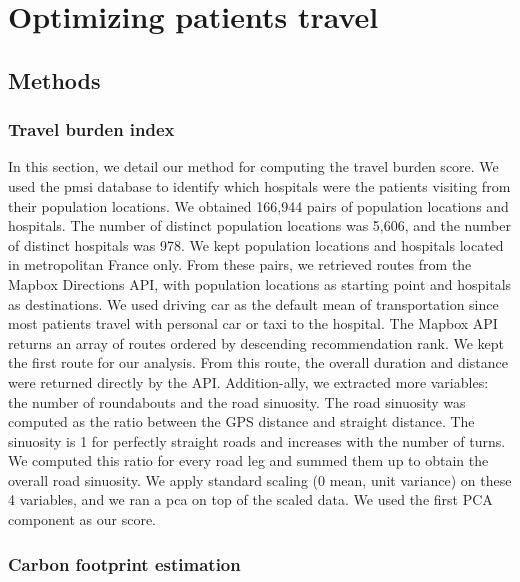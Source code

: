 \chapter{Optimizing patients travel}

\section{Methods}

\subsection{Travel burden index}

In this section, we detail our method for computing the travel burden score. We
used the \ac{pmsi} database to identify which hospitals were the patients
visiting from their population locations. We obtained 166,944 pairs of
population locations and hospitals. The number of distinct population locations
was 5,606, and the number of distinct hospitals was 978. We kept population
locations and hospitals located in metropolitan France only. From these pairs,
we retrieved routes from the Mapbox Directions API, with population locations as
starting point and hospitals as destinations.  We used driving car as the
default mean of transportation since most patients travel with personal car or
taxi to the hospital. The Mapbox API returns an array of routes ordered by
descending recommendation rank. We kept the first route for our analysis. From
this route, the overall duration and distance were returned directly by the API.
Addition-ally, we extracted more variables: the number of roundabouts and the
road sinuosity. The road sinuosity was computed as the ratio between the GPS
distance and straight distance. The sinuosity is 1 for perfectly straight roads
and increases with the number of turns. We computed this ratio for every road
leg and summed them up to obtain the overall road sinuosity. We apply standard
scaling (0 mean, unit variance) on these 4 variables, and we ran a \ac{pca} on
top of the scaled data. We used the first PCA component as our score.

\subsection{Carbon footprint estimation}

